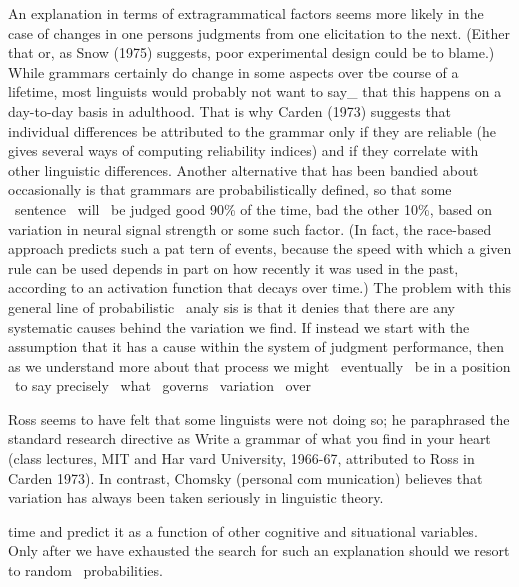 \begin{styleStandard}
An explanation in terms of extragrammatical factors seems more likely in the case of changes in one person{\textquotesingle}s judgments from one elicitation to the next. (Either that or, as Snow (1975) suggests, poor experimental design could be to blame.) While grammars certainly do change in some aspects over tbe course of a lifetime, most linguists would probably not want to say\_ that this happens on a day-to-day basis in adulthood. That is why Carden (1973) suggests that individual differences be attributed to the grammar only if they are reliable (he gives several ways of computing reliability indices) and if they correlate with other linguistic differences. Another alternative that has been bandied about occasionally is that grammars are probabilistically defined, so that some \ sentence \ will \ be judged good 90\% of the time, bad the other 10\%, based on variation in neural signal strength or some such factor. (In fact, the race-based approach predicts such a pat\- tern of events, because the speed with which a given rule can be used depends in part on how recently it was used in the past, according to an activation function that decays over time.) The problem with this general line of probabilistic \ analy\- sis is that it denies that there are any systematic causes behind the variation we find. If instead we start with the assumption that it has a cause within the system of judgment performance, then as we understand more about that process we might \ eventually \ be in a position \ to say precisely \ what \ governs \ variation \ over
\end{styleStandard}


\setcounter{listWWNumxvileveli}{19}
\begin{listWWNumxvileveli}
\item 
\begin{styleStandard}
Ross seems to have felt that some linguists were not doing so; he paraphrased the standard research directive as {\textquotedbl}Write a grammar of what you find in your heart{\textquotedbl} (class lectures, MIT and Har\- vard University, 1966-67, attributed to Ross in Carden 1973). In contrast, Chomsky (personal com\- munication) believes that variation has always been taken seriously in linguistic theory.
\end{styleStandard}


\end{listWWNumxvileveli}
\clearpage\setcounter{page}{1}\begin{styleStandard}
time and predict it as a function of other cognitive and situational variables. Only after we have exhausted the search for such an explanation should we resort to random \ probabilities.
\end{styleStandard}



